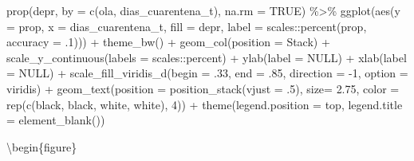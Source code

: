 \documentclass[
  12pt,
]{book}
\newenvironment{Shaded}{\begin{snugshade}}{\end{snugshade}}
\newcommand{\AttributeTok}[1]{\textcolor[rgb]{0.77,0.63,0.00}{#1}}
\newcommand{\ConstantTok}[1]{\textcolor[rgb]{0.00,0.00,0.00}{#1}}
\newcommand{\DecValTok}[1]{\textcolor[rgb]{0.00,0.00,0.81}{#1}}
\newcommand{\FloatTok}[1]{\textcolor[rgb]{0.00,0.00,0.81}{#1}}
\newcommand{\FunctionTok}[1]{\textcolor[rgb]{0.00,0.00,0.00}{#1}}
\newcommand{\NormalTok}[1]{#1}
\newcommand{\SpecialCharTok}[1]{\textcolor[rgb]{0.00,0.00,0.00}{#1}}
\newcommand{\StringTok}[1]{\textcolor[rgb]{0.31,0.60,0.02}{#1}}
\begin{document}
\begin{Shaded}
\begin{Highlighting}[]
  \FunctionTok{prop}\NormalTok{(depr, }\AttributeTok{by =} \FunctionTok{c}\NormalTok{(ola, dias\_cuarentena\_t), }\AttributeTok{na.rm =} \ConstantTok{TRUE}\NormalTok{) }\SpecialCharTok{\%\textgreater{}\%}  
  \FunctionTok{ggplot}\NormalTok{(}\FunctionTok{aes}\NormalTok{(}\AttributeTok{y =}\NormalTok{ prop, }\AttributeTok{x =}\NormalTok{ dias\_cuarentena\_t, }\AttributeTok{fill =}\NormalTok{ depr,}
             \AttributeTok{label =}\NormalTok{ scales}\SpecialCharTok{::}\FunctionTok{percent}\NormalTok{(prop, }\AttributeTok{accuracy =}\NormalTok{ .}\DecValTok{1}\NormalTok{))) }\SpecialCharTok{+} 
  \FunctionTok{theme\_bw}\NormalTok{() }\SpecialCharTok{+} 
  \FunctionTok{geom\_col}\NormalTok{(}\AttributeTok{position =} \StringTok{\textquotesingle{}Stack\textquotesingle{}}\NormalTok{) }\SpecialCharTok{+}
  \FunctionTok{scale\_y\_continuous}\NormalTok{(}\AttributeTok{labels =}\NormalTok{ scales}\SpecialCharTok{::}\NormalTok{percent) }\SpecialCharTok{+}
  \FunctionTok{ylab}\NormalTok{(}\AttributeTok{label =} \ConstantTok{NULL}\NormalTok{) }\SpecialCharTok{+}
  \FunctionTok{xlab}\NormalTok{(}\AttributeTok{label =} \ConstantTok{NULL}\NormalTok{) }\SpecialCharTok{+}
  \FunctionTok{scale\_fill\_viridis\_d}\NormalTok{(}\AttributeTok{begin =}\NormalTok{ .}\DecValTok{33}\NormalTok{, }\AttributeTok{end =}\NormalTok{ .}\DecValTok{85}\NormalTok{, }\AttributeTok{direction =} \SpecialCharTok{{-}}\DecValTok{1}\NormalTok{, }\AttributeTok{option =} \StringTok{\textquotesingle{}viridis\textquotesingle{}}\NormalTok{) }\SpecialCharTok{+}
  \FunctionTok{geom\_text}\NormalTok{(}\AttributeTok{position =} \FunctionTok{position\_stack}\NormalTok{(}\AttributeTok{vjust =}\NormalTok{ .}\DecValTok{5}\NormalTok{),}
            \AttributeTok{size=} \FloatTok{2.75}\NormalTok{, }\AttributeTok{color =} \FunctionTok{rep}\NormalTok{(}\FunctionTok{c}\NormalTok{(}\StringTok{\textquotesingle{}black\textquotesingle{}}\NormalTok{, }\StringTok{\textquotesingle{}black\textquotesingle{}}\NormalTok{, }\StringTok{\textquotesingle{}white\textquotesingle{}}\NormalTok{, }\StringTok{\textquotesingle{}white\textquotesingle{}}\NormalTok{), }\DecValTok{4}\NormalTok{)) }\SpecialCharTok{+}
  \FunctionTok{theme}\NormalTok{(}\AttributeTok{legend.position =} \StringTok{\textquotesingle{}top\textquotesingle{}}\NormalTok{,}
        \AttributeTok{legend.title =} \FunctionTok{element\_blank}\NormalTok{())}
\end{Highlighting}
\end{Shaded}

\textbackslash begin\{figure\}
\end{document}
